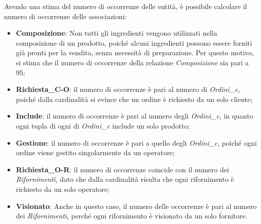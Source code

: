\documentclass[12pt,a4paper]{article}
\begin{document}
    \vspace{8pt}
    \noindent
    Avendo una stima del numero di occorrenze delle entità, è possibile calcolare il numero di occorrenze delle associazioni:
    \begin{itemize}[leftmargin=1em]
        \item \textbf{Composizione}: Non tutti gli ingredienti vengono utilizzati nella composizione di un prodotto, poiché alcuni ingredienti possono essere forniti già pronti per la vendita, senza necessità di preparazione. Per questo motivo, si stima che il numero di occorrenze della relazione \textit{Composizione} sia pari a 95;
        \item  \textbf{Richiesta\_C-O}: il numero di occorrenze è pari al numero di \textit{Ordini\_c}, poiché dalla cardinalità si evince che un ordine è richiesto da un solo cliente;
        \item \textbf{Include}: il numero di occorrenze è pari al numero degli \textit{Ordini\_c}, in quanto ogni tupla di ogni  di \textit{Ordini\_c} include un solo prodotto;
        \item \textbf{Gestione}: il numero di occorrenze è pari a quello degli \textit{Ordini\_c}, poiché ogni ordine viene gestito singolarmente da un operatore;
        \item \textbf{Richiesta\_O-R}: il numero di occorrenze coincide con il numero dei \textit{Rifornimenti}, dato che dalla cardinalità risulta che ogni rifornimento è richiesto da un solo operatore;
        \item \textbf{Visionato}: Anche in questo caso, il numero delle occorrenze è pari al numero dei \textit{Rifornimenti},  perché ogni rifornimento è visionato da un solo fornitore.
    \end{itemize}
\end{document}
